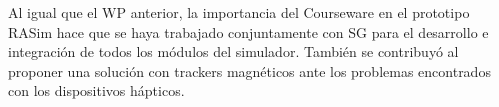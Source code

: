 \begin{itemize}
{Al igual que el \ac{WP} anterior, la importancia del \ac{Courseware} en el prototipo \ac{RASim} hace que se haya trabajado conjuntamente con \ac{SG} para el desarrollo e integración de todos los módulos del simulador. También se contribuyó al proponer una solución con \acs{tracker}s magnéticos ante los problemas encontrados con los dispositivos hápticos.}



\end{itemize}
